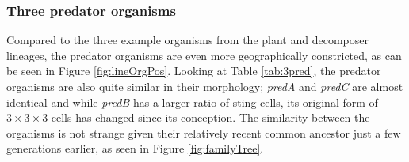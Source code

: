 \subsubsection{Three predator organisms}\label{subsubsec:3pred}
Compared to the three example organisms from the plant and decomposer lineages, the predator organisms are even more geographically constricted, as can be seen in Figure \ref{fig:lineOrgPos}. Looking at Table \ref{tab:3pred}, the predator organisms are also quite similar in their morphology; \emph{predA} and \emph{predC} are almost identical and while \emph{predB} has a larger ratio of sting cells, its original form of \(3 \times 3 \times 3\) cells has changed since its conception. The similarity between the organisms is not strange given their relatively recent common ancestor just a few generations earlier, as seen in Figure \ref{fig:familyTree}.
